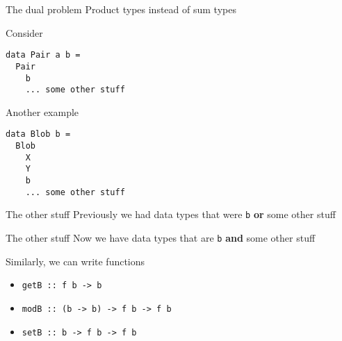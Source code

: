 \begin{frame}[fragile]
\begin{block}{The dual problem}
Product types instead of sum types
\end{block}
\end{frame}

\begin{frame}[fragile]
\begin{block}{Consider}
\begin{lstlisting}[style=haskell]
data Pair a b =
  Pair
    b
    ... some other stuff
\end{lstlisting}
\end{block}
\end{frame}

\begin{frame}[fragile]
\begin{block}{Another example}
\begin{lstlisting}[style=haskell]
data Blob b =
  Blob
    X
    Y
    b
    ... some other stuff
\end{lstlisting}
\end{block}
\end{frame}

\begin{frame}[fragile]
\begin{block}{The other stuff}
Previously we had data types that were \lstinline{b} \textbf{or} some other stuff
\end{block}
\end{frame}

\begin{frame}[fragile]
\begin{block}{The other stuff}
Now we have data types that are \lstinline{b} \textbf{and} some other stuff
\end{block}
\end{frame}

\begin{frame}[fragile]
\begin{block}{Similarly, we can write functions}
\begin{itemize}
\item<1-> \lstinline{getB :: f b -> b}
\item<2-> \lstinline{modB :: (b -> b) -> f b -> f b}
\item<3-> \lstinline{setB :: b -> f b -> f b}
\end{itemize}
\end{block}
\end{frame}

